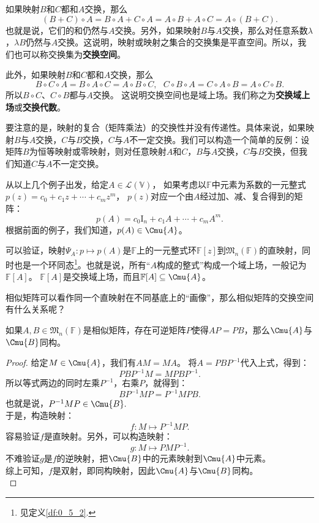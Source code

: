 \documentclass[12pt,UTF8]{ctexbook}
\begin{document}
如果映射$B$和$C$都和$A$交换，那么
$$ (B+C)\circ A = B\circ A + C\circ A = A\circ B + A\circ C = A\circ (B+C).$$
也就是说，它们的和仍然与$A$交换。另外，如果映射$B$与$A$交换，那么对任意系数$\lambda$，$\lambda B$仍然与$A$交换。这说明，映射或映射之集合的交换集是平直空间。所以，我们也可以称交换集为\textbf{交换空间}。

此外，如果映射$B$和$C$都和$A$交换，那么
$$ B\circ C\circ A = B\circ A\circ C = A\circ B\circ C, \,\,\,\, C\circ B\circ A = C\circ A\circ B = A\circ C\circ B.$$
所以$B\circ C$、$C\circ B$都与$A$交换。
这说明交换空间也是域上场。我们称之为\textbf{交换域上场}或\textbf{交换代数}。

要注意的是，映射的复合（矩阵乘法）的交换性并没有传递性。具体来说，如果映射$B$与$A$交换，$C$与$B$交换，$C$与$A$不一定交换。我们可以构造一个简单的反例：设矩阵$B$为恒等映射或零映射，则对任意映射$A$和$C$，$B$与$A$交换，$C$与$B$交换，但我们知道$C$与$A$不一定交换。

从以上几个例子出发，给定$A \in \mathcal{L}(\mathbb{V})$，
如果考虑以$\mathbb{F}$中元素为系数的一元整式$p(z) = c_0 + c_1 z + \cdots + c_m z^m$，
$p(z)$对应一个由$A$经过加、减、复合得到的矩阵：
$$ p(A) = c_0 \mathrm{I}_n + c_1 A + \cdots + c_m A^m.$$
根据前面的例子，我们知道，$p(A) \in \Cmu{A}$。

可以验证，映射$\Psi_A: p \mapsto p(A)$是$\mathbb{F}$上的一元整式环$\mathbb{F}[z]$到$\mathfrak{M}_n(\mathbb{F})$的直映射，同时也是一个环同态\footnote{见定义\ref{df:0_5_2}.}。也就是说，所有“$A$构成的整式”构成一个域上场，一般记为$\mathbb{F}[A]$。
$\mathbb{F}[A]$是交换域上场，而且$\mathbb{F}[A] \subseteq \Cmu{A}$。

相似矩阵可以看作同一个直映射在不同基底上的“画像”，那么相似矩阵的交换空间有什么关系呢？
\begin{pp}\label{pp:5_3}
    如果$A, B \in \mathfrak{M}_n(\mathbb{F})$是相似矩阵，存在可逆矩阵$P$使得$AP = PB$，那么$\Cmu{A}$与$\Cmu{B}$同构。
\end{pp}
\begin{proof} %
    给定$M \in \Cmu{A}$，我们有$ AM = MA$。
    将$A = PBP^{-1}$代入上式，得到：
    $$ PBP^{-1}M = MPBP^{-1}.$$
    所以等式两边的同时左乘$P^{-1}$，右乘$P$，就得到：
    $$  BP^{-1}MP = P^{-1}MPB. $$
    也就是说，$ P^{-1}MP \in \Cmu{B}.$\\
    于是，构造映射：
    $$ f : M \mapsto P^{-1}MP.$$
    容易验证$f$是直映射。另外，可以构造映射：
    $$ g : M \mapsto PMP^{-1}.$$
    不难验证$g$是$f$的逆映射，把$\Cmu{B}$中的元素映射到$\Cmu{A}$中元素。\\
    综上可知，$f$是双射，即同构映射，因此$\Cmu{A}$与$\Cmu{B}$同构。\\
\end{proof}
\end{document}
